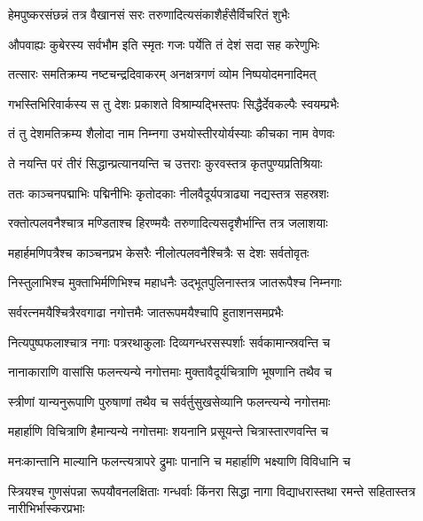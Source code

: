 \twolineshloka
{हेमपुष्करसंछन्नं तत्र वैखानसं सरः}
{तरुणादित्यसंकाशैर्हंसैर्विचरितं शुभैः} %

\twolineshloka
{औपवाह्यः कुबेरस्य सर्वभौम इति स्मृतः}
{गजः पर्येति तं देशं सदा सह करेणुभिः} %

\twolineshloka
{तत्सारः समतिक्रम्य नष्टचन्द्रदिवाकरम्}
{अनक्षत्रगणं व्योम निष्पयोदमनादिमत्} %

\twolineshloka
{गभस्तिभिरिवार्कस्य स तु देशः प्रकाशते}
{विश्राम्यद्भिस्तपः सिद्धैर्देवकल्पैः स्वयम्प्रभैः} %

\twolineshloka
{तं तु देशमतिक्रम्य शैलोदा नाम निम्नगा}
{उभयोस्तीरयोर्यस्याः कीचका नाम वेणवः} %

\twolineshloka
{ते नयन्ति परं तीरं सिद्धान्प्रत्यानयन्ति च}
{उत्तराः कुरवस्तत्र कृतपुण्यप्रतिश्रियाः} %

\twolineshloka
{ततः काञ्चनपद्माभिः पद्मिनीभिः कृतोदकाः}
{नीलवैदूर्यपत्राढ्या नद्यस्तत्र सहस्रशः} %

\twolineshloka
{रक्तोत्पलवनैश्चात्र मण्डिताश्च हिरण्मयैः}
{तरुणादित्यसदृशैर्भान्ति तत्र जलाशयाः} %

\twolineshloka
{महार्हमणिपत्रैश्च काञ्चनप्रभ केसरैः}
{नीलोत्पलवनैश्चित्रैः स देशः सर्वतोवृतः} %

\twolineshloka
{निस्तुलाभिश्च मुक्ताभिर्मणिभिश्च महाधनैः}
{उद्भूतपुलिनास्तत्र जातरूपैश्च निम्नगाः} %

\twolineshloka
{सर्वरत्नमयैश्चित्रैरवगाढा नगोत्तमैः}
{जातरूपमयैश्चापि हुताशनसमप्रभैः} %

\twolineshloka
{नित्यपुष्पफलाश्चात्र नगाः पत्ररथाकुलाः}
{दिव्यगन्धरसस्पर्शाः सर्वकामान्स्रवन्ति च} %

\twolineshloka
{नानाकाराणि वासांसि फलन्त्यन्ये नगोत्तमाः}
{मुक्तावैदूर्यचित्राणि भूषणानि तथैव च} %

\twolineshloka
{स्त्रीणां यान्यनुरूपाणि पुरुषाणां तथैव च}
{सर्वर्तुसुखसेव्यानि फलन्त्यन्ये नगोत्तमाः} %

\twolineshloka
{महार्हाणि विचित्राणि हैमान्यन्ये नगोत्तमाः}
{शयनानि प्रसूयन्ते चित्रास्तारणवन्ति च} %

\twolineshloka
{मनःकान्तानि माल्यानि फलन्त्यत्रापरे द्रुमाः}
{पानानि च महार्हाणि भक्ष्याणि विविधानि च} %

\threelineshloka
{स्त्रियश्च गुणसंपन्ना रूपयौवनलक्षिताः}
{गन्धर्वाः किंनरा सिद्धा नागा विद्याधरास्तथा}
{रमन्ते सहितास्तत्र नारीभिर्भास्करप्रभाः} %

